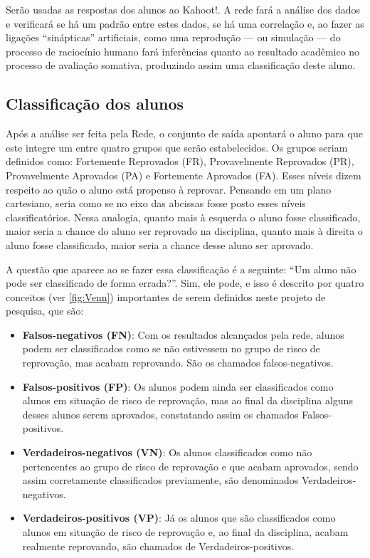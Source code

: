 \documentclass[
	12pt,				%
	openright,			%
	oneside,
	a4paper,			%
	english,			%
	french,				%
	spanish,			%
	brazil,				%
	]{abntex2}
\begin{document}
Serão usadas as respostas dos alunos ao Kahoot!. A rede fará a análise dos dados e verificará se há um padrão entre estes dados, se há uma correlação e, ao fazer as ligações ``sinápticas'' artificiais, como uma reprodução --- ou simulação --- do processo de raciocínio humano fará inferências quanto ao resultado acadêmico no processo de avaliação somativa, produzindo assim uma classificação deste aluno.

\subsection{Classificação dos alunos}
Após a análise ser feita pela Rede, o conjunto de saída apontará o aluno para que este integre um entre quatro grupos que serão estabelecidos. Os grupos seriam definidos como: Fortemente Reprovados (FR), Provavelmente Reprovados (PR), Provavelmente Aprovados (PA) e Fortemente Aprovados (FA). Esses níveis dizem respeito ao quão o aluno está propenso à reprovar. Pensando em um plano cartesiano, seria como se no eixo das abcissas fosse posto esses níveis classificatórios. Nessa analogia, quanto mais à esquerda o aluno fosse classificado, maior seria a chance do aluno ser reprovado na disciplina, quanto mais à direita o aluno fosse classificado, maior seria a chance desse aluno ser aprovado.

A questão que aparece ao se fazer essa classificação é a seguinte: ``Um aluno não pode ser classificado de forma errada?''. Sim, ele pode, e isso é descrito por quatro conceitos (ver \autoref{fig:Venn}) importantes de serem definidos neste projeto de pesquisa, que são:

\begin{itemize}
    \item \textbf{Falsos-negativos (FN)}: Com os resultados alcançados pela rede, alunos podem ser classificados como se não estivessem no grupo de risco de reprovação, mas acabam reprovando. São os chamados falsos-negativos.
    \item \textbf{Falsos-positivos (FP)}: Os alunos podem ainda ser classificados como alunos em situação de risco de reprovação, mas ao final da disciplina alguns desses alunos serem aprovados, constatando assim os chamados Falsos-positivos.
    \item \textbf{Verdadeiros-negativos (VN)}: Os alunos classificados como não pertencentes ao grupo de risco de reprovação e que acabam aprovados, sendo assim corretamente classificados previamente, são denominados Verdadeiros-negativos.
    \item \textbf{Verdadeiros-positivos (VP)}: Já os alunos que são classificados como alunos em situação de risco de reprovação e, ao final da disciplina, acabam realmente reprovando, são chamados de Verdadeiros-positivos.
\end{itemize}
\end{document}
